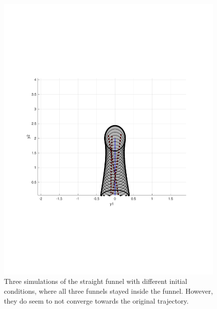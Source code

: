 \begin{figure}
  \includegraphics[scale=0.5]{figures/funnel/straight_simulation}
  \caption{Three simulations of the straight funnel with different initial
    conditions, where all three funnels stayed inside the funnel. However, they
    do seem to not converge towards the original trajectory.}
\end{figure} 


